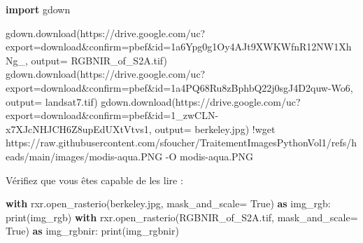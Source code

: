 \documentclass[
]{article}
\newenvironment{Shaded}{}{}
\newcommand{\BuiltInTok}[1]{\textcolor[rgb]{0.00,0.50,0.00}{#1}}
\newcommand{\ControlFlowTok}[1]{\textcolor[rgb]{0.00,0.44,0.13}{\textbf{#1}}}
\newcommand{\ImportTok}[1]{\textcolor[rgb]{0.00,0.50,0.00}{\textbf{#1}}}
\newcommand{\NormalTok}[1]{#1}
\newcommand{\OperatorTok}[1]{\textcolor[rgb]{0.40,0.40,0.40}{#1}}
\newcommand{\StringTok}[1]{\textcolor[rgb]{0.25,0.44,0.63}{#1}}
\newcommand{\VariableTok}[1]{\textcolor[rgb]{0.10,0.09,0.49}{#1}}
\begin{document}
\label{a0e83a09}
\label{cb3}
\begin{Shaded}
\begin{Highlighting}[]
\ImportTok{import}\NormalTok{ gdown}

\NormalTok{gdown.download(}\StringTok{\textquotesingle{}https://drive.google.com/uc?export=download\&confirm=pbef\&id=1a6Ypg0g1Oy4AJt9XWKWfnR12NW1XhNg\_\textquotesingle{}}\NormalTok{, output}\OperatorTok{=} \StringTok{\textquotesingle{}RGBNIR\_of\_S2A.tif\textquotesingle{}}\NormalTok{)}
\NormalTok{gdown.download(}\StringTok{\textquotesingle{}https://drive.google.com/uc?export=download\&confirm=pbef\&id=1a4PQ68Ru8zBphbQ22j0sgJ4D2quw{-}Wo6\textquotesingle{}}\NormalTok{, output}\OperatorTok{=} \StringTok{\textquotesingle{}landsat7.tif\textquotesingle{}}\NormalTok{)}
\NormalTok{gdown.download(}\StringTok{\textquotesingle{}https://drive.google.com/uc?export=download\&confirm=pbef\&id=1\_zwCLN{-}x7XJcNHJCH6Z8upEdUXtVtvs1\textquotesingle{}}\NormalTok{, output}\OperatorTok{=} \StringTok{\textquotesingle{}berkeley.jpg\textquotesingle{}}\NormalTok{)}
\OperatorTok{!}\NormalTok{wget https:}\OperatorTok{//}\NormalTok{raw.githubusercontent.com}\OperatorTok{/}\NormalTok{sfoucher}\OperatorTok{/}\NormalTok{TraitementImagesPythonVol1}\OperatorTok{/}\NormalTok{refs}\OperatorTok{/}\NormalTok{heads}\OperatorTok{/}\NormalTok{main}\OperatorTok{/}\NormalTok{images}\OperatorTok{/}\NormalTok{modis}\OperatorTok{{-}}\NormalTok{aqua.PNG }\OperatorTok{{-}}\NormalTok{O modis}\OperatorTok{{-}}\NormalTok{aqua.PNG}
\end{Highlighting}
\end{Shaded}

Vérifiez que vous êtes capable de les lire :

\label{6ff6fd43}
\label{cb4}
\begin{Shaded}
\begin{Highlighting}[]
\ControlFlowTok{with}\NormalTok{ rxr.open\_rasterio(}\StringTok{\textquotesingle{}berkeley.jpg\textquotesingle{}}\NormalTok{, mask\_and\_scale}\OperatorTok{=} \VariableTok{True}\NormalTok{) }\ImportTok{as}\NormalTok{ img\_rgb:}
    \BuiltInTok{print}\NormalTok{(img\_rgb)}
\ControlFlowTok{with}\NormalTok{ rxr.open\_rasterio(}\StringTok{\textquotesingle{}RGBNIR\_of\_S2A.tif\textquotesingle{}}\NormalTok{, mask\_and\_scale}\OperatorTok{=} \VariableTok{True}\NormalTok{) }\ImportTok{as}\NormalTok{ img\_rgbnir:}
    \BuiltInTok{print}\NormalTok{(img\_rgbnir)}
\end{Highlighting}
\end{Shaded}
\end{document}
